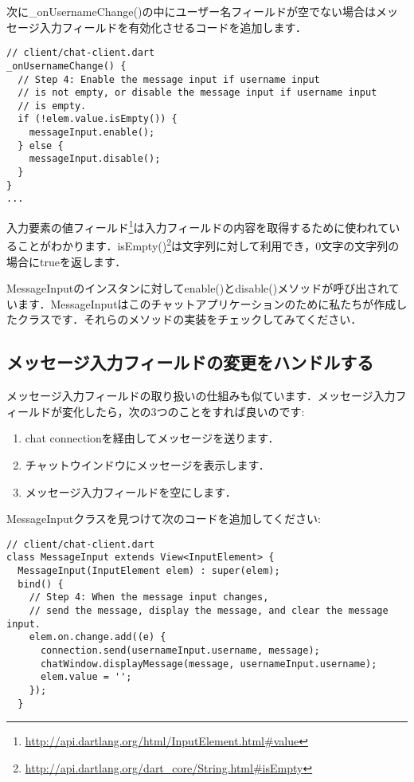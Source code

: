 次に\_onUsernameChange()の中にユーザー名フィールドが空でない場合はメッセージ入力フィールドを有効化させるコードを追加します．

\begin{verbatim}
// client/chat-client.dart
_onUsernameChange() {
  // Step 4: Enable the message input if username input
  // is not empty, or disable the message input if username input
  // is empty.
  if (!elem.value.isEmpty()) {
    messageInput.enable();
  } else {
    messageInput.disable();
  }
}
...
\end{verbatim}

入力要素の値フィールド\footnote{\url{http://api.dartlang.org/html/InputElement.html#value}}は入力フィールドの内容を取得するために使われていることがわかります．isEmpty()\footnote{\url{http://api.dartlang.org/dart_core/String.html#isEmpty}}は文字列に対して利用でき，0文字の文字列の場合にtrueを返します．

MessageInputのインスタンに対してenable()とdisable()メソッドが呼び出されています．MessageInputはこのチャットアプリケーションのために私たちが作成したクラスです．それらのメソッドの実装をチェックしてみてください．

\subsection{メッセージ入力フィールドの変更をハンドルする}

メッセージ入力フィールドの取り扱いの仕組みも似ています．メッセージ入力フィールドが変化したら，次の3つのことをすれば良いのです:

\begin{enumerate}
\item chat connectionを経由してメッセージを送ります．
\item チャットウインドウにメッセージを表示します．
\item メッセージ入力フィールドを空にします．
\end{enumerate}

MessageInputクラスを見つけて次のコードを追加してください:

\begin{verbatim}
// client/chat-client.dart
class MessageInput extends View<InputElement> {
  MessageInput(InputElement elem) : super(elem);
  bind() {
    // Step 4: When the message input changes,
    // send the message, display the message, and clear the message input.
    elem.on.change.add((e) {
      connection.send(usernameInput.username, message);
      chatWindow.displayMessage(message, usernameInput.username);
      elem.value = '';
    });
  }
\end{verbatim}

